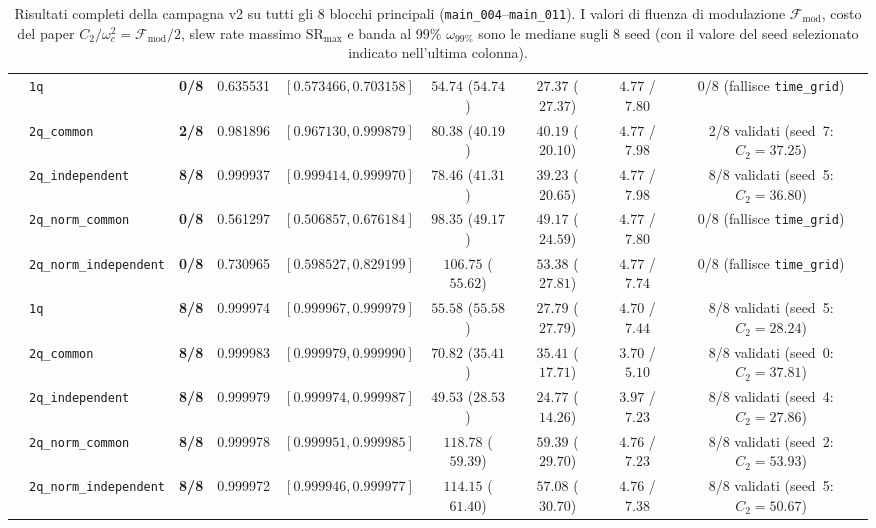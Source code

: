 \documentclass[11pt,a4paper]{article}
\begin{document}
\begin{table}[H]
{\begin{tabular}{llccccccc}
\midrule
{}
 & \texttt{1q} & \textbf{0/8} & 0.635531 & $[0.573466, 0.703158]$ & $54.74$ ($54.74$) & $27.37$ ($27.37$) & $4.77$ / $7.80$ & 0/8 (fallisce \texttt{time\_grid}) \\
 & \texttt{2q\_common} & \textbf{2/8} & 0.981896 & $[0.967130, 0.999879]$ & $80.38$ ($40.19$) & $40.19$ ($20.10$) & $4.77$ / $7.98$ & 2/8 validati (seed~7: $C_2=37.25$) \\
 & \texttt{2q\_independent} & \textbf{8/8} & 0.999937 & $[0.999414, 0.999970]$ & $78.46$ ($41.31$) & $39.23$ ($20.65$) & $4.77$ / $7.98$ & 8/8 validati (seed~5: $C_2=36.80$) \\
 & \texttt{2q\_norm\_common} & \textbf{0/8} & 0.561297 & $[0.506857, 0.676184]$ & $98.35$ ($49.17$) & $49.17$ ($24.59$) & $4.77$ / $7.80$ & 0/8 (fallisce \texttt{time\_grid}) \\
 & \texttt{2q\_norm\_independent} & \textbf{0/8} & 0.730965 & $[0.598527, 0.829199]$ & $106.75$ ($55.62$) & $53.38$ ($27.81$) & $4.77$ / $7.74$ & 0/8 (fallisce \texttt{time\_grid}) \\
\midrule
{}
 & \texttt{1q} & \textbf{8/8} & 0.999974 & $[0.999967, 0.999979]$ & $55.58$ ($55.58$) & $27.79$ ($27.79$) & $4.70$ / $7.44$ & 8/8 validati (seed~5: $C_2=28.24$) \\
 & \texttt{2q\_common} & \textbf{8/8} & 0.999983 & $[0.999979, 0.999990]$ & $70.82$ ($35.41$) & $35.41$ ($17.71$) & $3.70$ / $5.10$ & 8/8 validati (seed~0: $C_2=37.81$) \\
 & \texttt{2q\_independent} & \textbf{8/8} & 0.999979 & $[0.999974, 0.999987]$ & $49.53$ ($28.53$) & $24.77$ ($14.26$) & $3.97$ / $7.23$ & 8/8 validati (seed~4: $C_2=27.86$) \\
 & \texttt{2q\_norm\_common} & \textbf{8/8} & 0.999978 & $[0.999951, 0.999985]$ & $118.78$ ($59.39$) & $59.39$ ($29.70$) & $4.76$ / $7.23$ & 8/8 validati (seed~2: $C_2=53.93$) \\
 & \texttt{2q\_norm\_independent} & \textbf{8/8} & 0.999972 & $[0.999946, 0.999977]$ & $114.15$ ($61.40$) & $57.08$ ($30.70$) & $4.76$ / $7.38$ & 8/8 validati (seed~5: $C_2=50.67$) \\
\bottomrule
\end{tabular}%
}
\caption{Risultati completi della campagna v2 su tutti gli 8 blocchi principali (\texttt{main\_004}--\texttt{main\_011}). I valori di fluenza di modulazione $\mathcal{F}_{\text{mod}}$, costo del paper $C_2/\omega_c^2 = \mathcal{F}_{\text{mod}}/2$, slew rate massimo $\text{SR}_{\max}$ e banda al 99\% $\omega_{99\%}$ sono le mediane sugli 8 seed (con il valore del seed selezionato indicato nell'ultima colonna).}
\label{tab:risultati_campagna}
\end{table}
\end{document}
